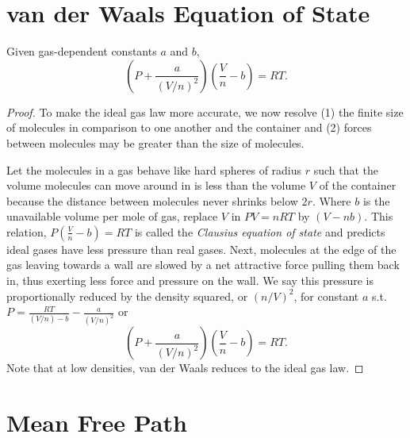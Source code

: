 \section{van der Waals Equation of State}

\begin{theorem}
    Given gas-dependent constants $a$ and $b$, $$(P + \frac{a}{(V/n)^2})(\frac{V}{n} - b) = RT.$$
\end{theorem}
\begin{proof}
    To make the ideal gas law more accurate, we now resolve (1) the finite size of molecules in comparison to one another and the container and (2) forces between molecules may be greater than the size of molecules.

    Let the molecules in a gas behave like hard spheres of radius $r$ such that the volume molecules can move around in is less than the volume $V$ of the container because the distance between molecules never shrinks below $2r$. Where $b$ is the unavailable volume per mole of gas, replace $V$ in $PV=nRT$ by $(V-nb)$. This relation, $P(\frac{V}{n} - b) = RT$ is called the \emph{Clausius equation of state} and predicts ideal gases have less pressure than real gases. Next, molecules at the edge of the gas leaving towards a wall are slowed by a net attractive force pulling them back in, thus exerting less force and pressure on the wall. We say this pressure is proportionally reduced by the density squared, or $(n/V)^2$, for constant $a$ s.t. $P = \frac{RT}{(V/n)-b}-\frac{a}{(V/n)^2}$ or $$(P+\frac{a}{(V/n)^2})(\frac{V}{n}-b)=RT.$$ Note that at low densities, van der Waals reduces to the ideal gas law. 
\end{proof}

\section{Mean Free Path}

